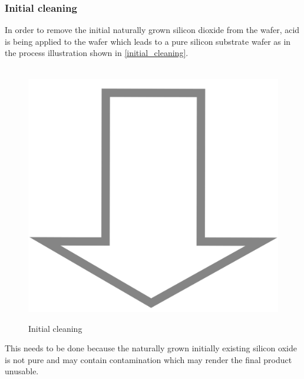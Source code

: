 \newpage

\subsubsection{Initial cleaning}
In order to remove the initial naturally grown silicon dioxide from the wafer, acid is being applied to the wafer which leads to a pure silicon substrate wafer as in the process illustration shown in \autoref{initial_cleaning}.

\begin{figure}[H]
	\centering
	\begin{tikzpicture}[node distance = 3cm, auto, thick,scale=\CrossSectionOnly, every node/.style={transform shape}]
		
	\end{tikzpicture} \\
	\includegraphics[scale=0.01]{down_arrow.png} \\
	\begin{tikzpicture}[node distance = 3cm, auto, thick,scale=\CrossSectionOnly, every node/.style={transform shape}]
		
	\end{tikzpicture}
	\caption{Initial cleaning}
	\label{initial_cleaning}
\end{figure}

This needs to be done because the naturally grown initially existing silicon oxide is not pure and may contain contamination which may render the final product unusable.

